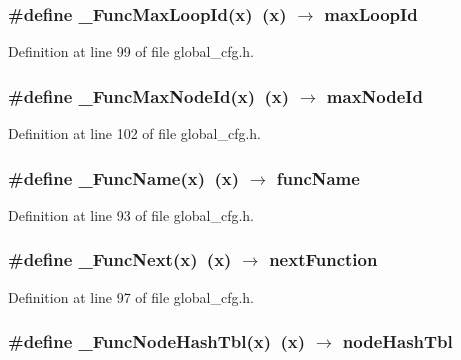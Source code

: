 \subsubsection{\setlength{\rightskip}{0pt plus 5cm}\#define \_\-Func\-Max\-Loop\-Id(x)~(x) $\rightarrow$ max\-Loop\-Id}\label{global__cfg_8h_0231ea2b19827fe8fbcd97bd28c8f556}




Definition at line 99 of file global\_\-cfg.h.
\subsubsection{\setlength{\rightskip}{0pt plus 5cm}\#define \_\-Func\-Max\-Node\-Id(x)~(x) $\rightarrow$ max\-Node\-Id}\label{global__cfg_8h_6876c4420ce3234e2fa357da0d35486a}




Definition at line 102 of file global\_\-cfg.h.
\subsubsection{\setlength{\rightskip}{0pt plus 5cm}\#define \_\-Func\-Name(x)~(x) $\rightarrow$ func\-Name}\label{global__cfg_8h_13a2d173413ec40cf17270394cded1bb}




Definition at line 93 of file global\_\-cfg.h.
\subsubsection{\setlength{\rightskip}{0pt plus 5cm}\#define \_\-Func\-Next(x)~(x) $\rightarrow$ next\-Function}\label{global__cfg_8h_d32d81e023b6c3a1aea6c5b307183afa}




Definition at line 97 of file global\_\-cfg.h.
\subsubsection{\setlength{\rightskip}{0pt plus 5cm}\#define \_\-Func\-Node\-Hash\-Tbl(x)~(x) $\rightarrow$ node\-Hash\-Tbl}\label{global__cfg_8h_02dec17f8511bf2df9499ac9edda72df}




